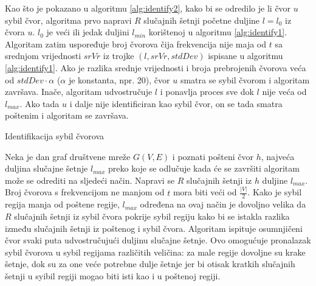 \documentclass[times, utf8, seminar, numeric]{fer}
\begin{document}
Kao što je pokazano u algoritmu \ref{alg:identify2}, kako bi se odredilo je li čvor $u$ sybil čvor, algoritma prvo napravi $R$ slučajnih šetnji početne duljine $l = l_0$ iz čvora $u$. $l_0$ je veći ili jedak duljini $l_{min}$ korištenoj u algoritmu \ref{alg:identify1}. Algoritam zatim uspoređuje broj čvorova čija frekvencija nije maja od $t$ sa srednjom vrijednosti $srVr$ iz trojke $(l, srVr, stdDev)$ ispisane u algoritmu \ref{alg:identify1}. Ako je razlika srednje vrijednosti i broja prebrojenih čvorova veća od $stdDev \cdot \alpha$ ($\alpha$ je konstanta, npr. 20), čvor $u$ smatra se sybil čvorom i algoritam završava. Inače, algoritam udvostručuje $l$ i ponavlja proces sve dok $l$ nije veća od $l_{max}$. Ako tada $u$ i dalje nije identificiran kao sybil čvor, on se tada smatra poštenim i algoritam se završava.

\begin{algorithm}[h]
	\caption{Identifikacija sybil čvorova}
	\label{alg:identify2}

  
\end{algorithm}

Neka je dan graf društvene mreže $G(V, E)$ i poznati pošteni čvor $h$, najveća duljina slučajne šetnje $l_{max}$ preko koje se odlučuje kada će se završiti algoritam može se odrediti na sljedeći način. Napravi se $R$ slučajnih šetnji iz $h$ duljine $l_{max}$. Broj čvorova s frekvencijom ne manjom od $t$ mora biti veći od $\frac{|V|}{2}$. Kako je sybil regija manja od poštene regije, $l_{max}$ određena na ovaj način je dovoljno velika da $R$ slučajnih šetnji iz sybil čvora pokrije sybil regiju kako bi se istakla razlika između slučajnih šetnji iz poštenog i sybil čvora. Algoritam ispituje osumnjičeni čvor svaki puta udvostručujući duljinu slučajne šetnje. Ovo omogućuje pronalazak sybil čvorova u sybil regijama različitih veličina: za male regije dovoljne su krake šetnje, dok su za one veće potrebne dulje šetnje jer bi otisak kratkih slučajnih šetnji u syibil regiji mogao biti isti kao i u poštenoj regiji.
\end{document}
